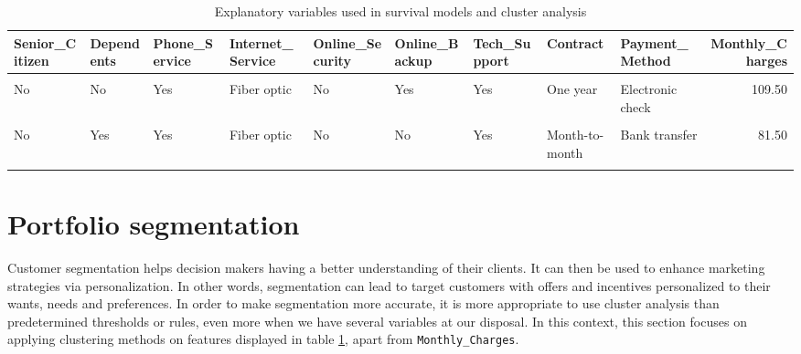 \documentclass[
]{book}
\begin{document}
\begin{table}[H]

\caption{\label{tab:selectedfeatures}Explanatory variables used in survival models and cluster analysis}
\centering
\begin{tabular}[t]{lllllllllr}
\toprule
Senior\_Citizen & Dependents & Phone\_Service & Internet\_Service & Online\_Security & Online\_Backup & Tech\_Support & Contract & Payment\_Method & Monthly\_Charges\\
\midrule
\cellcolor{gray!6}{No} & \cellcolor{gray!6}{No} & \cellcolor{gray!6}{Yes} & \cellcolor{gray!6}{Fiber optic} & \cellcolor{gray!6}{Yes} & \cellcolor{gray!6}{No} & \cellcolor{gray!6}{No} & \cellcolor{gray!6}{Month-to-month} & \cellcolor{gray!6}{Bank transfer} & \cellcolor{gray!6}{89.40}\\
No & No & Yes & Fiber optic & No & Yes & Yes & One year & Electronic check & 109.50\\
\cellcolor{gray!6}{No} & \cellcolor{gray!6}{No} & \cellcolor{gray!6}{No} & \cellcolor{gray!6}{DSL} & \cellcolor{gray!6}{Yes} & \cellcolor{gray!6}{Yes} & \cellcolor{gray!6}{Yes} & \cellcolor{gray!6}{Two year} & \cellcolor{gray!6}{Bank transfer} & \cellcolor{gray!6}{45.05}\\
No & Yes & Yes & Fiber optic & No & No & Yes & Month-to-month & Bank transfer & 81.50\\
\cellcolor{gray!6}{No} & \cellcolor{gray!6}{No} & \cellcolor{gray!6}{No} & \cellcolor{gray!6}{DSL} & \cellcolor{gray!6}{Yes} & \cellcolor{gray!6}{No} & \cellcolor{gray!6}{Yes} & \cellcolor{gray!6}{Two year} & \cellcolor{gray!6}{Mailed check} & \cellcolor{gray!6}{38.90}\\
\bottomrule
\end{tabular}
\end{table}

\hypertarget{portfolio-segmentation}{%
\section{Portfolio segmentation}\label{portfolio-segmentation}}

Customer segmentation helps decision makers having a better understanding of their clients. It can then be used to enhance marketing strategies via personalization. In other words, segmentation can lead to target customers with offers and incentives personalized to their wants, needs and preferences. In order to make segmentation more accurate, it is more appropriate to use cluster analysis than predetermined thresholds or rules, even more when we have several variables at our disposal. In this context, this section focuses on applying clustering methods on features displayed in table \ref{tab:selectedfeatures}, apart from \texttt{Monthly\_Charges}.
\end{document}
